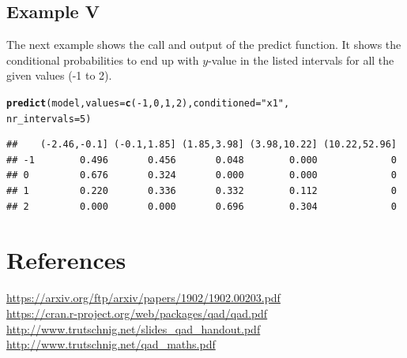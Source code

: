 \documentclass{scrartcl}\usepackage[]{graphicx}\usepackage[]{color}
\makeatletter
\newcommand{\hlnum}[1]{\textcolor[rgb]{0.686,0.059,0.569}{#1}}%
\newcommand{\hlstr}[1]{\textcolor[rgb]{0.192,0.494,0.8}{#1}}%
\newcommand{\hlopt}[1]{\textcolor[rgb]{0,0,0}{#1}}%
\newcommand{\hlstd}[1]{\textcolor[rgb]{0.345,0.345,0.345}{#1}}%
\newcommand{\hlkwc}[1]{\textcolor[rgb]{0.333,0.667,0.333}{#1}}%
\newcommand{\hlkwd}[1]{\textcolor[rgb]{0.737,0.353,0.396}{\textbf{#1}}}%
\newenvironment{kframe}{%
 \def\at@end@of@kframe{}%
 \ifinner\ifhmode%
  \def\at@end@of@kframe{\end{minipage}}%
  \begin{minipage}{\columnwidth}%
 \fi\fi%
 \def\FrameCommand##1{\hskip\@totalleftmargin \hskip-\fboxsep
 \colorbox{shadecolor}{##1}\hskip-\fboxsep
     \hskip-\linewidth \hskip-\@totalleftmargin \hskip\columnwidth}%
 \MakeFramed {\advance\hsize-\width
   \@totalleftmargin\z@ \linewidth\hsize
   \@setminipage}}%
 {\par\unskip\endMakeFramed%
 \at@end@of@kframe}
\newenvironment{knitrout}{}{} %
\makeatother
\begin{document}
\subsection{Example V}
The next example shows the call and output of the predict function. It shows the conditional probabilities to end up with $y$-value in the listed intervals for all the given values (-1 to 2).
\begin{knitrout}
\color{fgcolor}\begin{kframe}
\begin{alltt}
\hlkwd{predict}\hlstd{(model,} \hlkwc{values} \hlstd{=} \hlkwd{c}\hlstd{(}\hlopt{-}\hlnum{1}\hlstd{,}\hlnum{0}\hlstd{,}\hlnum{1}\hlstd{,}\hlnum{2}\hlstd{),} \hlkwc{conditioned} \hlstd{=} \hlstr{"x1"}\hlstd{,}
        \hlkwc{nr_intervals} \hlstd{=} \hlnum{5}\hlstd{)}
\end{alltt}
\begin{verbatim}
##    (-2.46,-0.1] (-0.1,1.85] (1.85,3.98] (3.98,10.22] (10.22,52.96]
## -1        0.496       0.456       0.048        0.000             0
## 0         0.676       0.324       0.000        0.000             0
## 1         0.220       0.336       0.332        0.112             0
## 2         0.000       0.000       0.696        0.304             0
\end{verbatim}
\end{kframe}
\end{knitrout}

\section*{References}	
\url{https://arxiv.org/ftp/arxiv/papers/1902/1902.00203.pdf} \\
\url{https://cran.r-project.org/web/packages/qad/qad.pdf} \\
\url{http://www.trutschnig.net/slides_qad_handout.pdf} \\
\url{http://www.trutschnig.net/qad_maths.pdf} 
\end{document}
